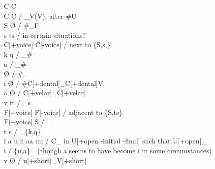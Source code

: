\documentclass[11pt]{article}
\begin{document}
C\textipa{:} \textrightarrow\hspace{0pt} C \\
C \textrightarrow\hspace{0pt} C\textipa{:} / _V(\textellipsis V), after \#U \\
S \textrightarrow\hspace{0pt} \O\hspace{0pt} / \#_F \\
s \textrightarrow\hspace{0pt} ts / in certain situations? \\
C[+voice] \textrightarrow\hspace{0pt} C[-voice] / next to \{S,s,\} \\
 \textrightarrow\hspace{0pt} k q / _\# \\
 \textrightarrow\hspace{0pt} a / _\# \\
 \textrightarrow\hspace{0pt} \O\hspace{0pt} / \#_ \\
i \textrightarrow\hspace{0pt} \O\hspace{0pt} / \#C[+dental]_C[+dental]V \\
a \textrightarrow\hspace{0pt} \O\hspace{0pt} / C[+velar]_C[+velar] \\
v \textrightarrow\hspace{0pt} ft / _s \\
F[+voice] \textrightarrow\hspace{0pt} F[-voice] / adjacent to \{S,ts\} \\
F[+voice] \textrightarrow\hspace{0pt} S / _ \\
t \textrightarrow\hspace{0pt} s / _\{k,q\} \\
i a u \textrightarrow\hspace{0pt} ii aa uu / C_ in U[+open -initial -final] such that U[+open]_ \\
 \textrightarrow\hspace{0pt} i / \{u,a\}_ (though a seems to have become i in some circumstances) \\
v \textrightarrow\hspace{0pt} \O\hspace{0pt} / u[+short]_V[+short] \\
\end{document}
